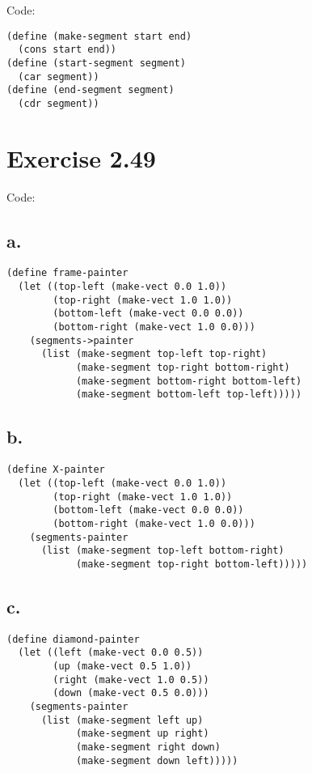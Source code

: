 \documentclass[../main.tex]{subfiles}
\begin{document}
Code:

\begin{lstlisting}
(define (make-segment start end)
  (cons start end))
(define (start-segment segment)
  (car segment))
(define (end-segment segment)
  (cdr segment))
\end{lstlisting}

\section{Exercise 2.49}

Code:

\subsection{a.}

\begin{lstlisting}
(define frame-painter
  (let ((top-left (make-vect 0.0 1.0))
        (top-right (make-vect 1.0 1.0))
        (bottom-left (make-vect 0.0 0.0))
        (bottom-right (make-vect 1.0 0.0)))
    (segments->painter
      (list (make-segment top-left top-right)
            (make-segment top-right bottom-right)
            (make-segment bottom-right bottom-left)
            (make-segment bottom-left top-left)))))
\end{lstlisting}

\subsection{b.}

\begin{lstlisting}
(define X-painter
  (let ((top-left (make-vect 0.0 1.0))
        (top-right (make-vect 1.0 1.0))
        (bottom-left (make-vect 0.0 0.0))
        (bottom-right (make-vect 1.0 0.0)))
    (segments-painter
      (list (make-segment top-left bottom-right)
            (make-segment top-right bottom-left)))))
\end{lstlisting}

\subsection{c.}

\begin{lstlisting}
(define diamond-painter
  (let ((left (make-vect 0.0 0.5))
        (up (make-vect 0.5 1.0))
        (right (make-vect 1.0 0.5))
        (down (make-vect 0.5 0.0)))
    (segments-painter
      (list (make-segment left up)
            (make-segment up right)
            (make-segment right down)
            (make-segment down left)))))
\end{lstlisting}
\end{document}
